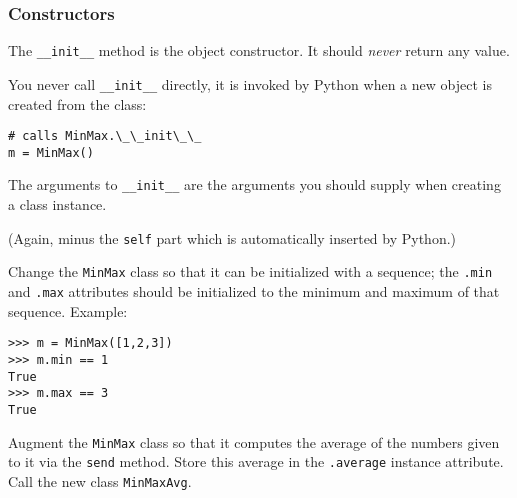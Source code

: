\documentclass[english,serif,mathserif,xcolor=pdftex,dvipsnames,table]{beamer}
\begin{document}
\begin{frame}[fragile]
  \frametitle{Constructors}

  The \lstinline|__init__| method is the object constructor.
  It should \emph{never} return any value.

  \+
  You never call \lstinline|__init__| directly, it is invoked by
  Python when a new object is created from the class:
\begin{lstlisting}
# calls MinMax.\_\_init\_\_
m = MinMax()
\end{lstlisting}

  \+
  The arguments to \lstinline|__init__| are the arguments you
  should supply when creating a class instance.

  \+
  (Again, minus the \texttt{self} part which is automatically
  inserted by Python.)
\end{frame}








\begin{frame}[fragile]
  \begin{exercise}
    Change the \texttt{MinMax} class so that it can be initialized
    with a sequence; the \texttt{.min} and \texttt{.max} attributes
    should be initialized to the minimum and maximum of that sequence.
    Example:
\begin{lstlisting}
>>> m = MinMax([1,2,3])
>>> m.min == 1
True
>>> m.max == 3
True
\end{lstlisting}
  \end{exercise}

  \begin{exercise}
    Augment the \texttt{MinMax} class so that it computes the
    average of the numbers given to it via the \texttt{send} method.
    Store this average in the \texttt{.average} instance attribute.
    Call the new class \texttt{MinMaxAvg}.
  \end{exercise}
\end{frame}


\end{document}
